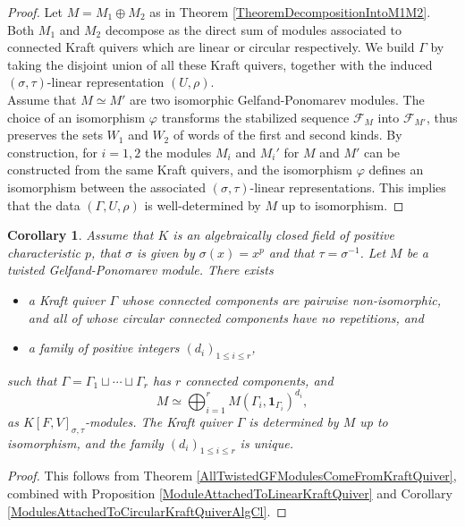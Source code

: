 \documentclass[12pt]{amsart}
\newtheorem{corollary}[theorem]{Corollary}
\theoremstyle{definition}
\newcommand{\<}{\langle}   %
\renewcommand{\>}{\rangle} %
\begin{document}
\begin{proof}
    Let $M = M_1 \oplus M_2$ as in Theorem \ref{TheoremDecompositionIntoM1M2}. Both $M_1$ and $M_2$ decompose as the direct sum of modules associated to connected Kraft quivers which are linear or circular respectively. We build $\Gamma$ by taking the disjoint union of all these Kraft quivers, together with the induced $(\sigma,\tau)$-linear representation $(U,\rho)$. \\
    Assume that $M \simeq M'$ are two isomorphic Gelfand-Ponomarev modules. The choice of an isomorphism $\varphi$ transforms the stabilized sequence $\mathcal F_M$ into $\mathcal F_{M'}$, thus preserves the sets $W_1$ and $W_2$ of words of the first and second kinds. By construction, for $i = 1,2$ the modules $M_i$ and $M_i'$ for $M$ and $M'$ can be constructed from the same Kraft quivers, and the isomorphism $\varphi$ defines an isomorphism between the associated $(\sigma,\tau)$-linear representations. This implies that the data $(\Gamma,U,\rho)$ is well-determined by $M$ up to isomorphism.
\end{proof}

\begin{corollary}
    Assume that $K$ is an algebraically closed field of positive characteristic $p$, that $\sigma$ is given by $\sigma(x) = x^p$ and that $\tau = \sigma^{-1}$. Let $M$ be a twisted Gelfand-Ponomarev module. There exists 
    \begin{itemize}
        \item a Kraft quiver $\Gamma$ whose connected components are pairwise non-isomorphic, and all of whose circular connected components have no repetitions, and
        \item a family of positive integers $(d_i)_{1\leq i \leq r}$,
    \end{itemize}
    such that $\Gamma = \Gamma_1 \sqcup \cdots \sqcup \Gamma_r$ has $r$ connected components, and 
    \begin{equation*}
        M \simeq \bigoplus_{i=1}^r M(\Gamma_i,\mathbf 1_{\Gamma_i})^{d_i},
    \end{equation*}
     as $K[F,V]_{\sigma,\tau}$-modules. The Kraft quiver $\Gamma$ is determined by $M$ up to isomorphism, and the family $(d_i)_{1\leq i\leq r}$ is unique.
\end{corollary}

\begin{proof}
    This follows from Theorem \ref{AllTwistedGFModulesComeFromKraftQuiver}, combined with Proposition \ref{ModuleAttachedToLinearKraftQuiver} and Corollary \ref{ModulesAttachedToCircularKraftQuiverAlgCl}.
\end{proof}
\end{document}
